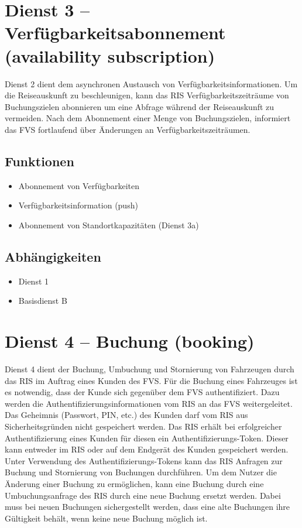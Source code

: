 \section{Dienst 3 -- Verfügbarkeitsabonnement (availability subscription) }
\label{sec:Hierachiemodell:Dienst3}
Dienst 2 dient dem asynchronen Austausch von Verfügbarkeitsinformationen. Um die Reiseauskunft zu beschleunigen, kann das RIS Verfügbarkeitszeiträume von Buchungszielen abonnieren um eine Abfrage während der Reiseauskunft zu vermeiden. Nach dem Abonnement einer Menge von Buchungszielen, informiert das FVS fortlaufend über Änderungen an Verfügbarkeitszeiträumen.

\subsection*{Funktionen}
\begin{itemize}
\item Abonnement von Verfügbarkeiten
\item Verfügbarkeitsinformation (push)
\item Abonnement von Standortkapazitäten (Dienst 3a)
\end{itemize}

\subsection*{Abhängigkeiten}
\begin{itemize}
\item Dienst 1
\item Basisdienst B
\end{itemize}


\section{Dienst 4 -- Buchung (booking)}
\label{sec:Hierachiemodell:Dienst4}
Dienst 4 dient der Buchung, Umbuchung und Stornierung von Fahrzeugen durch das RIS im Auftrag eines Kunden des FVS.
Für die Buchung eines Fahrzeuges ist es notwendig, dass der Kunde sich gegenüber dem FVS authentifiziert. Dazu werden die Authentifizierungsinformationen vom RIS an das FVS weitergeleitet. Das Geheimnis (Passwort, PIN, etc.) des Kunden darf vom RIS aus Sicherheitsgründen nicht gespeichert werden. Das RIS erhält bei erfolgreicher Authentifizierung eines Kunden für diesen ein Authentifizierungs-Token. Dieser kann entweder im RIS oder auf dem Endgerät des Kunden gespeichert werden. Unter Verwendung des Authentifizierungs-Tokens kann das RIS Anfragen zur Buchung und Stornierung von Buchungen durchführen.
Um dem Nutzer die Änderung einer Buchung zu ermöglichen, kann eine Buchung durch eine Umbuchungsanfrage des RIS durch eine neue Buchung ersetzt werden. Dabei muss bei neuen Buchungen sichergestellt werden, dass eine alte Buchungen ihre Gültigkeit behält, wenn keine neue Buchung möglich ist.

